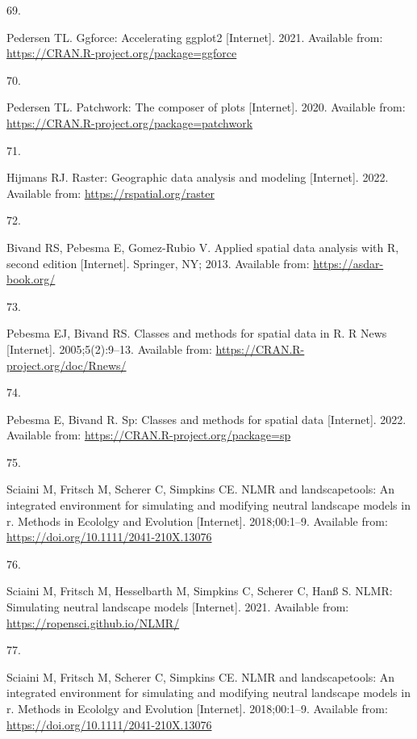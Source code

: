 \documentclass[10pt,a4paper]{article}
\newlength{\cslhangindent}
\newlength{\csllabelwidth}
\newlength{\cslentryspacingunit} %
\newenvironment{CSLReferences}[2] %
 {%
  \setlength{\parindent}{0pt}
  \ifodd #1
  \let\oldpar\par
  \def\par{\hangindent=\cslhangindent\oldpar}
  \fi
  \setlength{\parskip}{#2\cslentryspacingunit}
 }%
 {}
\newcommand{\CSLLeftMargin}[1]{\parbox[t]{\csllabelwidth}{#1}}
\newcommand{\CSLRightInline}[1]{\parbox[t]{\linewidth - \csllabelwidth}{#1}\break}
\begin{document}
\begin{CSLReferences}{0}{0}
\leavevmode{}%
\CSLLeftMargin{69. }
\CSLRightInline{Pedersen TL. Ggforce: Accelerating ggplot2 {[}Internet{]}. 2021. Available from: \url{https://CRAN.R-project.org/package=ggforce}}

\leavevmode{}%
\CSLLeftMargin{70. }
\CSLRightInline{Pedersen TL. Patchwork: The composer of plots {[}Internet{]}. 2020. Available from: \url{https://CRAN.R-project.org/package=patchwork}}

\leavevmode{}%
\CSLLeftMargin{71. }
\CSLRightInline{Hijmans RJ. Raster: Geographic data analysis and modeling {[}Internet{]}. 2022. Available from: \url{https://rspatial.org/raster}}

\leavevmode{}%
\CSLLeftMargin{72. }
\CSLRightInline{Bivand RS, Pebesma E, Gomez-Rubio V. Applied spatial data analysis with {R}, second edition {[}Internet{]}. Springer, NY; 2013. Available from: \url{https://asdar-book.org/}}

\leavevmode{}%
\CSLLeftMargin{73. }
\CSLRightInline{Pebesma EJ, Bivand RS. Classes and methods for spatial data in {R}. R News {[}Internet{]}. 2005;5(2):9--13. Available from: \url{https://CRAN.R-project.org/doc/Rnews/}}

\leavevmode{}%
\CSLLeftMargin{74. }
\CSLRightInline{Pebesma E, Bivand R. Sp: Classes and methods for spatial data {[}Internet{]}. 2022. Available from: \url{https://CRAN.R-project.org/package=sp}}

\leavevmode{}%
\CSLLeftMargin{75. }
\CSLRightInline{Sciaini M, Fritsch M, Scherer C, Simpkins CE. NLMR and landscapetools: An integrated environment for simulating and modifying neutral landscape models in r. Methods in Ecololgy and Evolution {[}Internet{]}. 2018;00:1--9. Available from: \url{https://doi.org/10.1111/2041-210X.13076}}

\leavevmode{}%
\CSLLeftMargin{76. }
\CSLRightInline{Sciaini M, Fritsch M, Hesselbarth M, Simpkins C, Scherer C, Hanß S. NLMR: Simulating neutral landscape models {[}Internet{]}. 2021. Available from: \url{https://ropensci.github.io/NLMR/}}

\leavevmode{}%
\CSLLeftMargin{77. }
\CSLRightInline{Sciaini M, Fritsch M, Scherer C, Simpkins CE. NLMR and landscapetools: An integrated environment for simulating and modifying neutral landscape models in r. Methods in Ecololgy and Evolution {[}Internet{]}. 2018;00:1--9. Available from: \url{https://doi.org/10.1111/2041-210X.13076}}


\end{CSLReferences}
\end{document}
